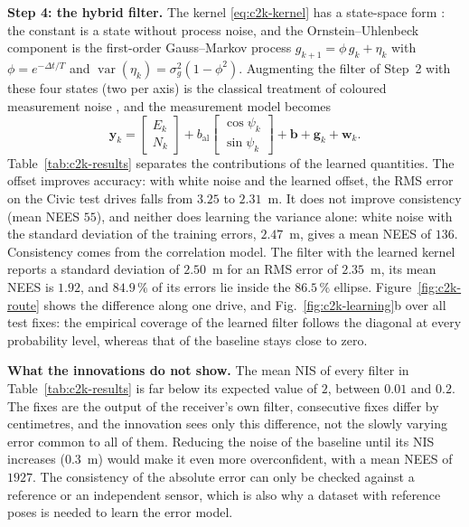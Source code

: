 \documentclass[graybox,envcountchap]{style/SNmono}
\begin{document}
\textbf{Step 4: the hybrid filter.} The kernel \eqref{eq:c2k-kernel} has a state-space form \cite{rasmussen2006_gp}: the constant is a state without process noise, and the Ornstein--Uhlenbeck component is the first-order Gauss--Markov process $g_{k+1}=\phi\,g_k+\eta_k$ with $\phi=e^{-\Delta t/T}$ and $\operatorname{var}(\eta_k)=\sigma_g^{2}(1-\phi^{2})$. Augmenting the filter of Step~2 with these four states (two per axis) is the classical treatment of coloured measurement noise \cite{barshalom2001_estimation}, and the measurement model becomes
\begin{equation}
\mathbf{y}_k=\begin{bmatrix}E_k\\ N_k\end{bmatrix}+b_{\mathrm{al}}\begin{bmatrix}\cos\psi_k\\ \sin\psi_k\end{bmatrix}+\mathbf{b}+\mathbf{g}_k+\mathbf{w}_k .
\label{eq:c2k-measurement}
\end{equation}
Table~\ref{tab:c2k-results} separates the contributions of the learned quantities. The offset improves accuracy: with white noise and the learned offset, the RMS error on the Civic test drives falls from $3.25$ to $2.31$~m. It does not improve consistency (mean NEES $55$), and neither does learning the variance alone: white noise with the standard deviation of the training errors, $2.47$~m, gives a mean NEES of $136$. Consistency comes from the correlation model. The filter with the learned kernel reports a standard deviation of $2.50$~m for an RMS error of $2.35$~m, its mean NEES is $1.92$, and $84.9\,\%$ of its errors lie inside the $86.5\,\%$ ellipse. Figure~\ref{fig:c2k-route} shows the difference along one drive, and Fig.~\ref{fig:c2k-learning}b over all test fixes: the empirical coverage of the learned filter follows the diagonal at every probability level, whereas that of the baseline stays close to zero.

\textbf{What the innovations do not show.} The mean NIS of every filter in Table~\ref{tab:c2k-results} is far below its expected value of $2$, between $0.01$ and $0.2$. The fixes are the output of the receiver's own filter, consecutive fixes differ by centimetres, and the innovation sees only this difference, not the slowly varying error common to all of them. Reducing the noise of the baseline until its NIS increases ($0.3$~m) would make it even more overconfident, with a mean NEES of $1927$. The consistency of the absolute error can only be checked against a reference or an independent sensor, which is also why a dataset with reference poses is needed to learn the error model.
\end{document}
